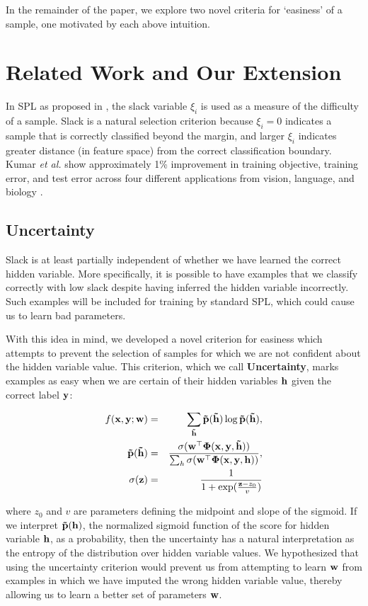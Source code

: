 \documentclass{article}
\newcommand{\mysection}[1]{\vspace{-4mm}\section{#1}\vspace{-4mm}}
\begin{document}
In the remainder of the paper, we explore two novel criteria for `easiness' of a sample, one motivated by each above intuition.

\mysection{Related Work and Our Extension}
\label{sec:related}
In SPL as proposed in \cite{SPL}, the slack variable $\xi_i$ is used as a measure of the difficulty of a sample.  Slack is a natural selection criterion because $\xi_i=0$ indicates a sample that is correctly classified beyond the margin, and larger $\xi_i$ indicates greater distance (in feature space) from the correct classification boundary. Kumar \textit{et al.} show approximately 1\% improvement in training objective, training error, and test error across four different applications from vision, language, and biology \cite{SPL}.

\subsection{Uncertainty}

Slack is at least partially independent of whether we have learned the correct hidden variable. More specifically, it is possible to have examples that we classify correctly with low slack despite having inferred the hidden variable incorrectly. Such examples will be included for training by standard SPL, which could cause us to learn bad parameters. 

With this idea in mind, we developed a novel criterion for easiness which attempts to prevent the selection of samples for which we are not confident about the hidden variable value. This criterion, which we call \textbf{Uncertainty}, marks examples as easy when we are certain of their hidden variables $\bf h$ given the correct label $\bf y$: 

\begin{eqnarray}
f(\bf x, \bf y; \bf w) &=& \sum_{\bf\tilde{h}} \bf\tilde p({\tilde h}) \log\bf\tilde p(\bf{\tilde h}),  \\
\bf{\tilde{p}(\tilde h)} &=&\frac{\sigma(\bf{w}^\top\Phi(\bf x,y, \tilde h))}{\sum_{h}\sigma(\bf w^\top\Phi(\bf x,\bf y,\bf h))}, \nonumber \\
\sigma(\bf z) &=& \frac{1}{1+\exp(\frac{{\bf z} - z_0}{v})} \nonumber
\label{eq:uncertainty}
\end{eqnarray}

where $z_0$ and $v$ are parameters defining the midpoint and slope of the sigmoid. If we interpret $\bf\tilde p(\bf h)$, the normalized sigmoid function of the score for hidden variable $\bf h$, as a probability, then the uncertainty has a natural interpretation as the entropy of the distribution over hidden variable values. We hypothesized that using the uncertainty criterion would prevent us from attempting to learn $\bf w$ from examples in which we have imputed the wrong hidden variable value, thereby allowing us to learn a better set of parameters $\bf w$. 
\end{document}
